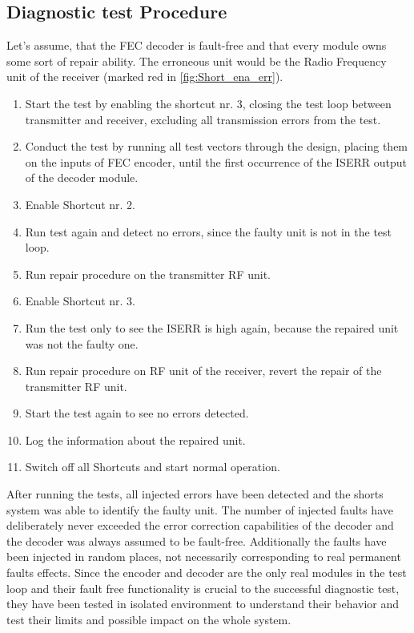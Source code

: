 \subsection{Diagnostic test Procedure}
Let's assume, that the FEC decoder is fault-free and that every module owns some sort of repair ability. The erroneous unit would be the Radio Frequency unit of the receiver (marked red in \autoref{fig:Short_ena_err}).
\begin{enumerate}
    \item Start the test by enabling the shortcut nr. 3, closing the test loop between transmitter and receiver, excluding all transmission errors from the test.
    \item Conduct the test by running all test vectors through the design, placing them on the inputs of FEC encoder, until the first occurrence of the ISERR output of the decoder module.
    \item Enable Shortcut nr. 2.
    \item Run test again and detect no errors, since the faulty unit is not in the test loop.
    \item Run repair procedure on the transmitter RF unit.
    \item Enable Shortcut nr. 3.
    \item Run the test only to see the ISERR is high again, because the repaired unit was not the faulty one.
    \item Run repair procedure on RF unit of the receiver, revert the repair of the transmitter RF unit.
    \item Start the test again to see no errors detected.
    \item Log the information about the repaired unit.
    \item Switch off all Shortcuts and start normal operation.
\end{enumerate}

After running the tests, all injected errors have been detected and the shorts system was able to identify the faulty unit. The number of injected faults have deliberately never exceeded the error correction capabilities of the decoder and the decoder was always assumed to be fault-free. Additionally the faults have been injected in random places, not necessarily corresponding to real permanent faults effects. Since the encoder and decoder are the only real modules in the test loop and their fault free functionality is crucial to the successful diagnostic test, they have been tested in isolated environment to understand their behavior and test their limits and possible impact on the whole system.

